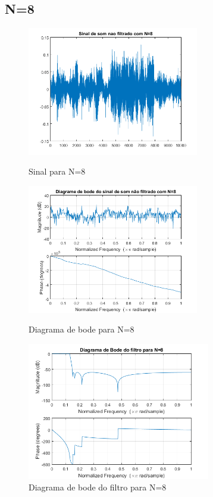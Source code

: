 \documentclass[11pt]{article}
\begin{document}
\subsection{N=8}
\begin{figure}[h]
\begin{center}
\begin{minipage}[b]{0.45\linewidth}
\includegraphics[width=7.5cm]{nfds8.png}
\caption{Sinal para N=8}
\label{figura8}
\end{minipage}
\begin{minipage}[b]{0.45\linewidth}
\includegraphics[width=7.5cm]{nfdb8.png}
\caption{Diagrama de bode para N=8}
\label{figura9}
\end{minipage}
\newline
\newline
\includegraphics[width=8cm]{filtro8.png}
\caption{Diagrama de bode do filtro para N=8}
\label{figura10}
\end{center}
\end{figure}
\end{document}
